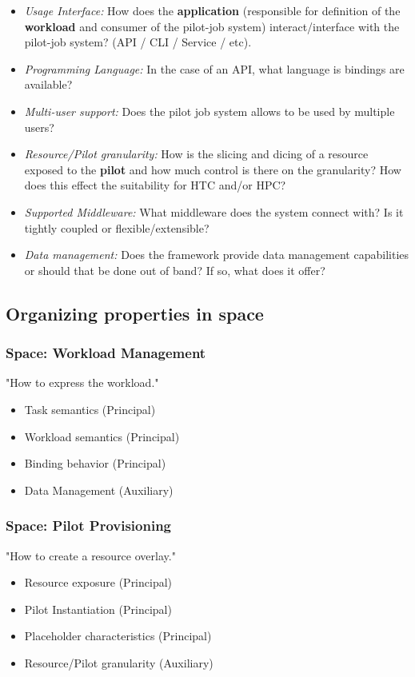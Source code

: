 \documentclass{sig-alternate}
\begin{document}
\begin{itemize}
\item \textit{Usage Interface:} How does the \textbf{application} (responsible for
definition of the \textbf{workload} and consumer of the pilot-job system)
interact/interface with the pilot-job system? (API / CLI / Service / etc).

\item \textit{Programming Language:} In the case of an API, what language is bindings are
available?

\item \textit{Multi-user support:} Does the pilot job system allows \textbf{\pilots} to
be used by multiple users?

\item \textit{Resource/Pilot granularity:} How is the slicing and dicing of a
resource exposed to the \textbf{pilot} and how much control is there on the
granularity? How does this effect the suitability for HTC and/or HPC?

\item \textit{Supported Middleware:} What middleware does the system connect with? Is it
tightly coupled or flexible/extensible?

\item \textit{Data management:} Does the framework provide data management
capabilities or should that be done out of band? If so, what does it offer?

\end{itemize}

\subsection{Organizing properties in space}

\subsubsection{Space: Workload Management}
"How to express the workload."
\begin{itemize}
\item Task semantics (Principal)
\item Workload semantics (Principal)
\item Binding behavior (Principal)
\item Data Management (Auxiliary)
\end{itemize}

\subsubsection{Space: Pilot Provisioning}
"How to create a resource overlay."
\begin{itemize}
\item Resource exposure (Principal)
\item Pilot Instantiation (Principal)
\item Placeholder characteristics (Principal)
\item Resource/Pilot granularity (Auxiliary)
\end{itemize}
\end{document}
